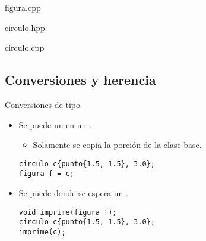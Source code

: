 \begin{frame}[t]
\begin{block}{figura.cpp}

\end{block}
\end{frame}

\begin{frame}[t]
\begin{block}{circulo.hpp}

\end{block}
\end{frame}

\begin{frame}[t]
\begin{block}{circulo.cpp}

\end{block}
\end{frame}

\subsection{Conversiones y herencia}

\begin{frame}[t,fragile]{Conversiones de tipo}
\begin{itemize}
  \item Se puede  
        un  en un .
    \begin{itemize}
      \item Solamente se copia la porción de la clase base.
    \end{itemize}
\begin{lstlisting}
circulo c{punto{1.5, 1.5}, 3.0};
figura f = c;
\end{lstlisting}

  \item Se puede  
         donde se espera un .
\begin{lstlisting}
void imprime(figura f);
circulo c{punto{1.5, 1.5}, 3.0};
imprime(c);
\end{lstlisting}

\end{itemize}
\end{frame}

